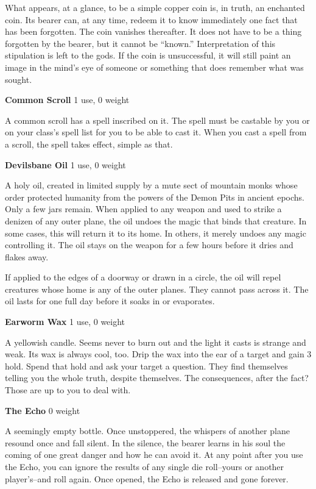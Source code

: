 What appears, at a glance, to be a simple copper coin is, in truth, an enchanted coin. Its bearer can, at any time, redeem it to know immediately one fact that has been forgotten. The coin vanishes thereafter. It does not have to be a thing forgotten by the bearer, but it cannot be ``known.'' Interpretation of this stipulation is left to the gods. If the coin is unsuccessful, it will still paint an image in the mind's eye of someone or something that does remember what was sought.

{\noindent \bfseries Common Scroll} \hspace*{\fill} 1 use, 0 weight

A common scroll has a spell inscribed on it. The spell must be castable by you or on your class's spell list for you to be able to cast it. When you cast a spell from a scroll, the spell takes effect, simple as that.

{\noindent \bfseries Devilsbane Oil} \hspace*{\fill} 1 use, 0 weight

A holy oil, created in limited supply by a mute sect of mountain monks whose order protected humanity from the powers of the Demon Pits in ancient epochs. Only a few jars remain. When applied to any weapon and used to strike a denizen of any outer plane, the oil undoes the magic that binds that creature. In some cases, this will return it to its home. In others, it merely undoes any magic controlling it. The oil stays on the weapon for a few hours before it dries and flakes away.

If applied to the edges of a doorway or drawn in a circle, the oil will repel creatures whose home is any of the outer planes. They cannot pass across it. The oil lasts for one full day before it soaks in or evaporates.

{\noindent \bfseries Earworm Wax} \hspace*{\fill} 1 use, 0 weight

A yellowish candle. Seems never to burn out and the light it casts is strange and weak. Its wax is always cool, too. Drip the wax into the ear of a target and gain 3 hold. Spend that hold and ask your target a question. They find themselves telling you the whole truth, despite themselves. The consequences, after the fact? Those are up to you to deal with.

{\noindent \bfseries The Echo} \hspace*{\fill} 0 weight

A seemingly empty bottle. Once unstoppered, the whispers of another plane resound once and fall silent. In the silence, the bearer learns in his soul the coming of one great danger and how he can avoid it. At any point after you use the Echo, you can ignore the results of any single die roll--yours or another player's--and roll again. Once opened, the Echo is released and gone forever.

